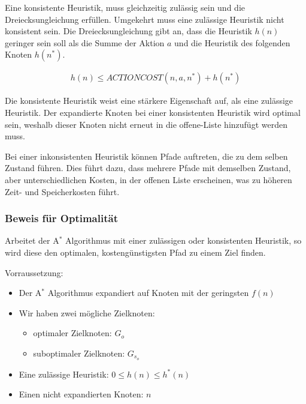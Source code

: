 Eine konsistente Heuristik, muss gleichzeitig zul\"{a}ssig sein und die Dreiecksungleichung erf\"{u}llen. Umgekehrt muss eine zul\"{a}ssige Heuristik nicht konsistent sein. Die Dreiecksungleichung gibt an, dass die Heuristik $h(n)$ geringer sein soll als die Summe der Aktion $a$ und die Heuristik des folgenden Knoten $h(n^*)$.


\begin{align}
	h(n) \leq \textit{ACTIONCOST}(n,a,n^*) + h(n^*)
\end{align}

Die konsistente Heuristik weist eine st\"{a}rkere Eigenschaft auf, als eine zul\"{a}ssige Heuristik. Der expandierte Knoten bei einer konsistenten Heuristik wird optimal sein, weshalb dieser Knoten nicht erneut in die offene-Liste hinzuf\"{u}gt werden muss.

Bei einer inkonsistenten Heuristik k\"{o}nnen Pfade auftreten, die zu dem selben Zustand f\"{u}hren. Dies f\"{u}hrt dazu, dass mehrere Pfade mit demselben Zustand, aber unterschiedlichen Kosten, in der offenen Liste erscheinen, was zu h\"{o}heren Zeit- und Speicherkosten f\"{u}hrt.

\subsubsection{Beweis f\"{u}r Optimalit\"{a}t}
\label{chap:a stern be}

Arbeitet der A$^*$ Algorithmus mit einer zul\"{a}ssigen oder konsistenten Heuristik, so wird diese den optimalen, kosteng\"{u}nstigsten Pfad zu einem Ziel finden.

Vorraussetzung:
\begin{itemize}
\item Der A$^*$ Algorithmus expandiert auf Knoten mit der geringsten $f(n)$
\item Wir haben zwei m\"{o}gliche Zielknoten:
\begin{itemize}
	\item optimaler Zielknoten: $G_o$
	\item suboptimaler Zielknoten: $G_s_o$
\end{itemize}
\item Eine zul\"{a}ssige Heuristik: $0 \leq h(n) \leq h^*(n)$
\item Einen nicht expandierten Knoten: $n$
\end{itemize}

